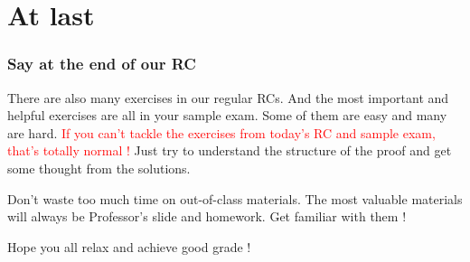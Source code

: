 \documentclass{beamer}
\begin{document}
\section{At last}
\begin{frame}
    \frametitle{Say at the end of our RC}
    There are also many exercises in our regular RCs. And the most important and helpful exercises are all in your sample exam. Some of them are easy and many are hard. \textcolor{red}{If you can't tackle the exercises from today's RC and sample exam, that's totally normal !} Just try to understand the structure of the proof and get some thought from the solutions.

    Don't waste too much time on out-of-class materials. The most valuable materials will always be Professor's slide and homework. Get familiar with them !

    \vspace{1em}
    \begin{center}
        Hope you all relax and achieve good grade !
    \end{center}
\end{frame}
\end{document}
